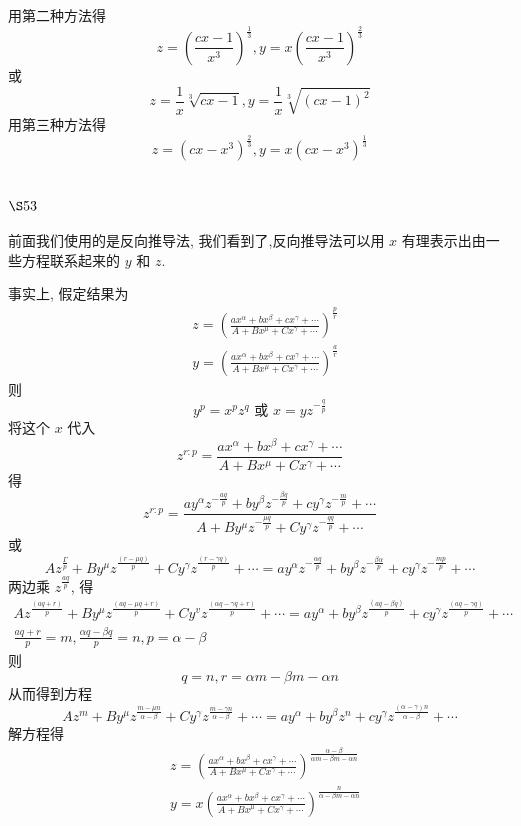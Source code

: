 用第二种方法得
\[
z=\left(\frac{c x-1}{x^{3}}\right)^{\frac{1}{3}}, y=x\left(\frac{c x-1}{x^{3}}\right)^{\frac{2}{3}}
\]
或
\[
z=\frac{1}{x} \sqrt[3]{c x-1}, y=\frac{1}{x} \sqrt[3]{(c x-1)^{2}}
\]
用第三种方法得
\[
z=\left(c x-x^{3}\right)^{\frac{2}{3}}, y=x\left(c x-x^{3}\right)^{\frac{1}{3}}
\]
\section{$\S 53$}

前面我们使用的是反向推导法, 我们看到了,反向推导法可以用 $x$ 有理表示出由一 些方程联系起来的 $y$ 和 $z$.

事实上, 假定结果为
\[
\begin{aligned}
& z=\left(\frac{a x^{\alpha}+b x^{\beta}+c x^{\gamma}+\cdots}{A+B x^{\mu}+C x^{\gamma}+\cdots}\right)^{\frac{p}{r}} \\
& y=\left(\frac{a x^{\alpha}+b x^{\beta}+c x^{\gamma}+\cdots}{A+B x^{\mu}+C x^{\gamma}+\cdots}\right)^{\frac{a}{r}}
\end{aligned}
\]
则
\[
y^{p}=x^{p} z^{q} \text { 或 } x=y z^{-\frac{q}{p}}
\]
将这个 $x$ 代入
\[
z^{r: p}=\frac{a x^{\alpha}+b x^{\beta}+c x^{\gamma}+\cdots}{A+B x^{\mu}+C x^{\gamma}+\cdots}
\]
得
\[
z^{r: p}=\frac{a y^{\alpha} z^{-\frac{a q}{p}}+b y^{\beta} z^{-\frac{\beta q}{p}}+c y^{\gamma} z^{-\frac{m}{p}}+\cdots}{A+B y^{\mu} z^{-\frac{\mu q}{p}}+C y^{\gamma} z^{-\frac{q q}{p}}+\cdots}
\]
或
\[
A z^{\frac{\Gamma}{p}}+B y^{\mu} z^{\frac{(r-\mu q)}{p}}+C y^{\gamma} z^{\frac{(r-\gamma q)}{p}}+\cdots=a y^{\alpha} z^{-\frac{\alpha q}{p}}+b y^{\beta} z^{-\frac{\beta \alpha}{p}}+c y^{\gamma} z^{-\frac{m p}{p}}+\cdots
\]
两边乘 $z^{\frac{a q}{p}}$, 得
\[
\begin{gathered}
A z^{\frac{(a q+r)}{p}}+B y^{\mu} z^{\frac{(a q-\mu q+r)}{p}}+C y^{v} z^{\frac{(\alpha q-\gamma q+r)}{p}}+\cdots=a y^{\alpha}+b y^{\beta} z^{\frac{(a q-\beta q)}{p}}+c y^{\gamma} z^{\frac{(a q-\gamma q)}{p}}+\cdots \\
\frac{a q+r}{p}=m, \frac{\alpha q-\beta q}{p}=n, p=\alpha-\beta
\end{gathered}
\]
则
\[
q=n, r=\alpha m-\beta m-\alpha n
\]
从而得到方程
\[
A z^{m}+B y^{\mu} z^{\frac{m-\mu n}{\alpha-\beta}}+C y^{\gamma} z^{\frac{m-\gamma n}{\alpha-\beta}}+\cdots=a y^{\alpha}+b y^{\beta} z^{n}+c y^{\gamma} z^{\frac{(\alpha-\gamma) n}{\alpha-\beta}}+\cdots
\]
解方程得
\[
\begin{aligned}
& z=\left(\frac{a x^{\alpha}+b x^{\beta}+c x^{\gamma}+\cdots}{A+B x^{\mu}+C x^{\gamma}+\cdots}\right)^{\frac{\alpha-\beta}{\alpha m-\beta m-\alpha n}} \\
& y=x\left(\frac{a x^{\alpha}+b x^{\beta}+c x^{\gamma}+\cdots}{A+B x^{\mu}+C x^{\gamma}+\cdots}\right)^{\frac{n}{\alpha-\beta m-\alpha n}}
\end{aligned}
\]

